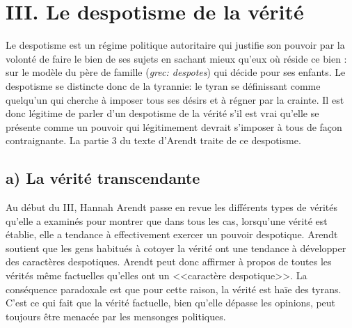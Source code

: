 \documentclass[12pt]{article}
\begin{document}
\section*{\color{red}III. Le despotisme de la vérité}
Le despotisme est un régime politique autoritaire qui justifie son pouvoir par la volonté de faire le bien de ses sujets en sachant mieux qu'eux où réside ce bien : sur le modèle du père de famille (\emph{grec: despotes}) qui décide pour ses enfants.
Le despotisme se distincte donc de la tyrannie: le tyran se définissant comme quelqu'un qui cherche à imposer tous ses désirs et à régner par la crainte.
Il est donc légitime de parler d'un despotisme de la vérité s'il est vrai qu'elle se présente comme un pouvoir qui légitimement devrait s'imposer à tous de façon contraignante.
La partie 3 du texte d'Arendt traite de ce despotisme.
\subsection*{a) La vérité transcendante}
Au début du III, Hannah Arendt passe en revue les différents types de vérités qu'elle a examinés pour montrer que dans tous les cas, lorsqu'une vérité est établie, elle a tendance à effectivement exercer un pouvoir despotique.
Arendt soutient que les gens habitués à cotoyer la vérité ont une tendance à développer des caractères despotiques.
Arendt peut donc affirmer à propos de toutes les vérités même factuelles qu'elles ont un <<caractère despotique>>.
La conséquence paradoxale est que pour cette raison, la vérité est haïe des tyrans.
C'est ce qui fait que la vérité factuelle, bien qu'elle dépasse les opinions, peut toujours être menacée par les mensonges politiques.
\end{document}
